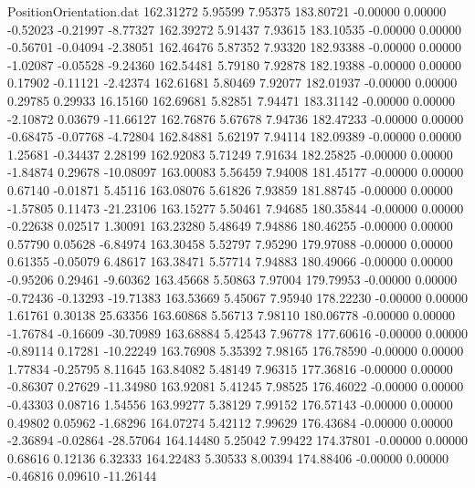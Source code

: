 \begin{filecontents}{PositionOrientation.dat}
 162.31272    5.95599    7.95375   183.80721   -0.00000    0.00000   -0.52023   -0.21997   -8.77327
 162.39272    5.91437    7.93615   183.10535   -0.00000    0.00000   -0.56701   -0.04094   -2.38051
 162.46476    5.87352    7.93320   182.93388   -0.00000    0.00000   -1.02087   -0.05528   -9.24360
 162.54481    5.79180    7.92878   182.19388   -0.00000    0.00000    0.17902   -0.11121   -2.42374
 162.61681    5.80469    7.92077   182.01937   -0.00000    0.00000    0.29785    0.29933   16.15160
 162.69681    5.82851    7.94471   183.31142   -0.00000    0.00000   -2.10872    0.03679  -11.66127
 162.76876    5.67678    7.94736   182.47233   -0.00000    0.00000   -0.68475   -0.07768   -4.72804
 162.84881    5.62197    7.94114   182.09389   -0.00000    0.00000    1.25681   -0.34437    2.28199
 162.92083    5.71249    7.91634   182.25825   -0.00000    0.00000   -1.84874    0.29678  -10.08097
 163.00083    5.56459    7.94008   181.45177   -0.00000    0.00000    0.67140   -0.01871    5.45116
 163.08076    5.61826    7.93859   181.88745   -0.00000    0.00000   -1.57805    0.11473  -21.23106
 163.15277    5.50461    7.94685   180.35844   -0.00000    0.00000   -0.22638    0.02517    1.30091
 163.23280    5.48649    7.94886   180.46255   -0.00000    0.00000    0.57790    0.05628   -6.84974
 163.30458    5.52797    7.95290   179.97088   -0.00000    0.00000    0.61355   -0.05079    6.48617
 163.38471    5.57714    7.94883   180.49066   -0.00000    0.00000   -0.95206    0.29461   -9.60362
 163.45668    5.50863    7.97004   179.79953   -0.00000    0.00000   -0.72436   -0.13293  -19.71383
 163.53669    5.45067    7.95940   178.22230   -0.00000    0.00000    1.61761    0.30138   25.63356
 163.60868    5.56713    7.98110   180.06778   -0.00000    0.00000   -1.76784   -0.16609  -30.70989
 163.68884    5.42543    7.96778   177.60616   -0.00000    0.00000   -0.89114    0.17281  -10.22249
 163.76908    5.35392    7.98165   176.78590   -0.00000    0.00000    1.77834   -0.25795    8.11645
 163.84082    5.48149    7.96315   177.36816   -0.00000    0.00000   -0.86307    0.27629  -11.34980
 163.92081    5.41245    7.98525   176.46022   -0.00000    0.00000   -0.43303    0.08716    1.54556
 163.99277    5.38129    7.99152   176.57143   -0.00000    0.00000    0.49802    0.05962   -1.68296
 164.07274    5.42112    7.99629   176.43684   -0.00000    0.00000   -2.36894   -0.02864  -28.57064
 164.14480    5.25042    7.99422   174.37801   -0.00000    0.00000    0.68616    0.12136    6.32333
 164.22483    5.30533    8.00394   174.88406   -0.00000    0.00000   -0.46816    0.09610  -11.26144

\end{filecontents}
